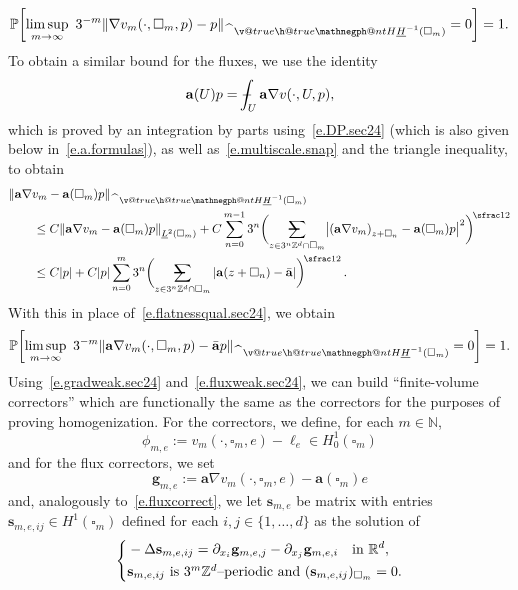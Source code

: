 \documentclass[11pt]{article} %
\makeatletter
\let\oldsquare\square %
\renewcommand{\square}{\oldsquare}
\numberwithin{equation}{section}
\theoremstyle{definition}
\let\originalleft\left
\let\originalright\right
\renewcommand{\left}{\mathopen{}\mathclose\bgroup\originalleft}
\renewcommand{\right}{\aftergroup\egroup\originalright}
\newcommand*{\N}{\ensuremath{\mathbb{N}}}
\newcommand*{\Z}{\ensuremath{\mathbb{Z}}}
\newcommand*{\R}{\ensuremath{\mathbb{R}}}
\newcommand*{\Zd}{\ensuremath{\mathbb{Z}^d}}
\renewcommand*{\hat}{\widehat}
\newcommand{\g}{\mathbf{g}}
\newcommand{\s}{\mathbf{s}}
\renewcommand{\a}{\mathbf{a}}
\newcommand{\ahom}{\bar{\a}}
\newcommand{\cu}{\square}
\renewcommand{\P}{\mathbb{P}}
\newcommand{\avsum}{\mathop{\mathpalette\avsuminner\relax}\displaylimits}
\newcommand\avsuminner[2]{%
  {\sbox0{$\m@th#1\sum$}%
   \vphantom{\usebox0}%
   \ooalign{%
     \hidewidth
     \smash{\,\rule[.23em]{8.8pt}{1.1pt} \relax}%
     \hidewidth\cr
     $\m@th#1\sum$\cr
   }%
  }%
}
\def\Xint#1{\mathchoice
{\XXint\displaystyle\textstyle{#1}}%
{\XXint\textstyle\scriptstyle{#1}}%
{\XXint\scriptstyle\scriptscriptstyle{#1}}%
{\XXint\scriptscriptstyle\scriptscriptstyle{#1}}%
\!\int}
\def\XXint#1#2#3{{\setbox0=\hbox{$#1{#2#3}{\int}$}
\vcenter{\hbox{$#2#3$}}\kern-.5\wd0}}
\def\fint{\Xint-}
\newcommand{\negphantom}{\v@true\h@true\negph@nt}
\newcommand{\negph@nt}{\ifmmode\expandafter\mathpalette 
  \expandafter\mathnegph@nt\else\expandafter\makenegph@nt\fi}
\newcommand{\makenegph@nt}[1]{%
  \setbox\z@\hbox{\color@begingroup#1\color@endgroup}\finnegph@nt}
\newcommand{\finnegph@nt}{%
  \setbox\tw@\null 
  \ifv@ \ht\tw@\ht\z@\dp\tw@\dp\z@\fi \ifh@\wd\tw@-\wd\z@\fi\box\tw@}
\newcommand{\mathnegph@nt}[2]{%
  \setbox\z@\hbox{$\m@th #1{#2}$}\finnegph@nt}
\newcommand{\Hminusul}{\hat{\phantom{H}}\negphantom{H}\underline{H}^{-1}}
\makeatother
\begin{document}
\begin{equation}
\label{e.gradweak.sec24}
\P \biggl[
\limsup_{m\to\infty} \ 
3^{-m} \left\| \nabla v_m(\cdot,\cu_m,p) - p \right\|_{\Hminusul(\cu_m)} = 0
\biggr] = 1. 
\end{equation}
To obtain a similar bound for the fluxes, we use the identity 
\begin{equation}
\label{e.flux.identity.sec24}
\a(U) p = \fint_{U} \a\nabla v(\cdot,U,p),
\end{equation}
which is proved by an integration by parts using~\eqref{e.DP.sec24} (which is also given below in~\eqref{e.a.formulas}), 
as well as~\eqref{e.multiscale.snap} and the triangle inequality, to obtain
\begin{align}
\label{e.flatnessqual.flux.sec24}
\lefteqn{
\left\| \a \nabla v_m - \a(\cu_m) p \right\|_{\Hminusul(\cu_m)}
} \qquad & 
\notag \\ &
\leq
C
\left\| \a \nabla v_m - \a(\cu_m) p \right\|_{ \underline{L}^2(\cu_m)} 
+
C 
\sum_{n=0}^{{m-1}} 3^{n} 
\biggl( \avsum_{z\in 3^n\Zd\cap \cu_{m}} 
\left| \left( \a \nabla v_m  \right)_{z+\cu_n} - \a(\cu_m) p \right|^2 \biggr)^{\!\sfrac12}
\notag \\ & 
\leq 
C|p| 
+ 
C |p|
\sum_{n=0}^{{m}} 3^{n} 
\biggl( \avsum_{z\in 3^n\Zd\cap \cu_{m}} 
| \a(z+\cu_n)
-
\ahom |
\biggr)^{\!\sfrac12}
\,.
\end{align}
With this in place of~\eqref{e.flatnessqual.sec24}, we obtain 
\begin{equation}
\label{e.fluxweak.sec24}
\P \biggl[
\limsup_{m\to\infty} \ 
3^{-m} \left\| \a \nabla v_m(\cdot,\cu_m,p) - \ahom p \right\|_{\Hminusul(\cu_m)} = 0
\biggr] = 1. 
\end{equation}
Using~\eqref{e.gradweak.sec24} and~\eqref{e.fluxweak.sec24}, we can build ``finite-volume correctors'' which are functionally the same as the correctors for the purposes of proving homogenization. For the correctors, we define, for each $m\in\N$, 
\begin{equation}
\label{e.FVC.def}
\phi_{m,e} := v_m(\cdot,\cu_m,e) - \ell_e \in H^1_0(\cu_m)
\end{equation}
and for the flux correctors, we set
\begin{equation*}
\g_{m,e} := \a \nabla v_m(\cdot,\cu_m,e) - \a(\cu_m) e
\end{equation*}
and, analogously to~\eqref{e.fluxcorrect}, we let $\s_{m,e}$ be matrix with entries~$\s_{m,e,ij} \in H^1(\cu_m)$ defined for each $i,j\in\{1,\ldots,d\}$ as the solution of  
\begin{equation}
\label{e.fluxcorrect.sec24}
\left\{
\begin{aligned}
&
-\Delta \s_{m,e,ij} = \partial_{x_i} \g_{m,e,j} - \partial_{x_j} \g_{m,e,i} 
\quad \mbox{in}  \ \R^d, \\
& \s_{m,e,ij}  \ \mbox{is $3^m\Z^d$--periodic and} \ ( \s_{m,e,ij} )_{\cu_m} = 0.
\end{aligned}
\right. 
\end{equation}
\end{document}
